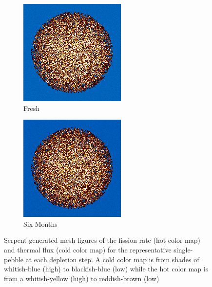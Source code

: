 \begin{figure}[H]
\centering
%
\begin{subfigure}{0.4\textwidth}
  \includegraphics[width=0.95\linewidth]{figures/burn-20-bstep0}
  \caption{Fresh}
  \label{fig:bstep0}
\end{subfigure}%
%
\begin{subfigure}{0.4\textwidth}
  \includegraphics[width=0.95\linewidth]{figures/burn-20-bstep1}
  \caption{Six Months}
  \label{fig:bstep1}
\end{subfigure}%

\caption{Serpent-generated mesh figures of the fission rate (hot color map) and thermal flux (cold color map) for the representative single-pebble at each depletion step.  A cold color map is from shades of whitish-blue (high) to blackish-blue (low) while the hot color map is from a whitish-yellow (high) to reddish-brown (low)}
\end{figure}

